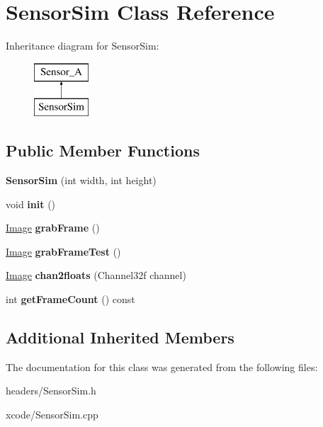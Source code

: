 \hypertarget{class_sensor_sim}{\section{Sensor\-Sim Class Reference}
\label{class_sensor_sim}
}
Inheritance diagram for Sensor\-Sim\-:\begin{figure}[H]
\begin{center}
\leavevmode
\includegraphics[height=2.000000cm]{class_sensor_sim}
\end{center}
\end{figure}
\subsection*{Public Member Functions}
\begin{DoxyCompactItemize}
\item 
\hypertarget{class_sensor_sim_a672d2aac6ce33643b136f4aee5125648}{{\bfseries Sensor\-Sim} (int width, int height)}\label{class_sensor_sim_a672d2aac6ce33643b136f4aee5125648}

\item 
\hypertarget{class_sensor_sim_afa58fe28d7ec3c75717438b96836501d}{void {\bfseries init} ()}\label{class_sensor_sim_afa58fe28d7ec3c75717438b96836501d}

\item 
\hypertarget{class_sensor_sim_a02725c6197d9d860d92da7a8a05dbe66}{\hyperlink{class_image}{Image} {\bfseries grab\-Frame} ()}\label{class_sensor_sim_a02725c6197d9d860d92da7a8a05dbe66}

\item 
\hypertarget{class_sensor_sim_a470016c6177cbc0898d5c9a5d9a1482b}{\hyperlink{class_image}{Image} {\bfseries grab\-Frame\-Test} ()}\label{class_sensor_sim_a470016c6177cbc0898d5c9a5d9a1482b}

\item 
\hypertarget{class_sensor_sim_af4fa753b72a31f646cbd8737c3a23264}{\hyperlink{class_image}{Image} {\bfseries chan2floats} (Channel32f channel)}\label{class_sensor_sim_af4fa753b72a31f646cbd8737c3a23264}

\item 
\hypertarget{class_sensor_sim_a717983aadf1eb7df2c7ae063bc460864}{int {\bfseries get\-Frame\-Count} () const }\label{class_sensor_sim_a717983aadf1eb7df2c7ae063bc460864}

\end{DoxyCompactItemize}
\subsection*{Additional Inherited Members}


The documentation for this class was generated from the following files\-:\begin{DoxyCompactItemize}
\item 
headers/Sensor\-Sim.\-h\item 
xcode/Sensor\-Sim.\-cpp\end{DoxyCompactItemize}
